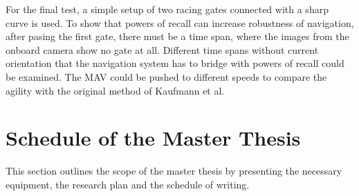 For the final test, a simple setup of two racing gates connected with a sharp curve is used.
To show that powers of recall can increase robustness of navigation,
after pasing the first gate, there must be a time span, where the images from the onboard camera show no gate at all.
Different time spans without current orientation that the navigation system has to bridge with powers of recall could be examined.
The MAV could be pushed to different speeds to compare the agility with the original method of Kaufmann et al. \cite{Kaufmann2018}
































\section{Schedule of the Master Thesis}

This section outlines the scope of the master thesis by presenting the necessary equipment,
the research plan and the schedule of writing.


